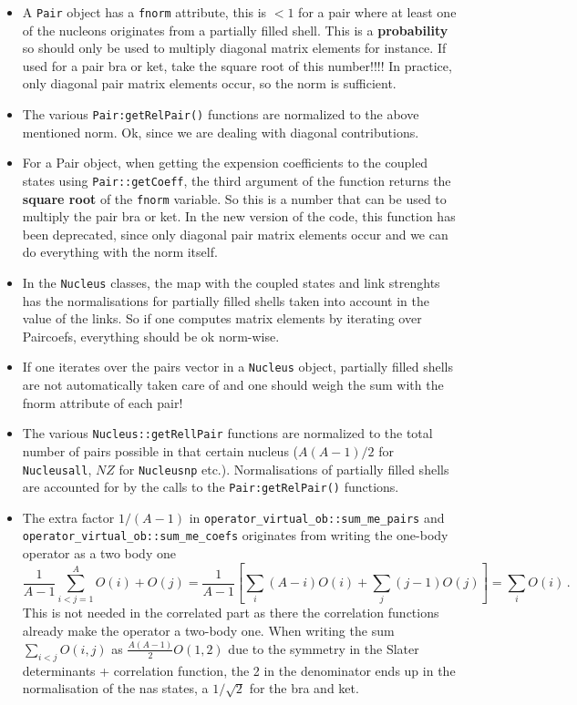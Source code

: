 \documentclass[10pt]{article}
\begin{document}
\begin{itemize}
 \item A \texttt{Pair} object has a \texttt{fnorm} attribute, this is $<1$ 
for a pair where at least one of the nucleons originates from a partially 
filled shell.  This is a \textbf{probability} so should only be used to 
multiply diagonal matrix elements for instance.  If used for a pair bra or ket, 
take the square root of this number!!!!  In practice, only diagonal pair matrix 
elements occur, so the norm is sufficient.

\item The various \texttt{Pair:getRelPair()} functions are normalized to the 
above mentioned norm.  Ok, since we are dealing with diagonal contributions.

\item For a Pair object, when getting the expension coefficients to the coupled 
states using \texttt{Pair::getCoeff}, the third argument of the function 
returns the \textbf{square root} of the \texttt{fnorm} variable.  So this is a 
number that can be used to multiply the pair bra or ket.
In the new version of the code, this function has been deprecated, since only 
diagonal pair matrix elements occur and we can do everything with the 
norm itself.

\item In the \texttt{Nucleus} classes, the map with the coupled states and link 
strenghts has the normalisations for partially filled shells taken into account 
in the value of the links.  So if one computes matrix elements by iterating 
over Paircoefs, everything should be ok norm-wise.

\item If one iterates over the pairs vector in a \texttt{Nucleus} object, 
partially filled shells are not automatically taken care of and one should 
weigh the sum with the fnorm attribute of each pair!

\item The various \texttt{Nucleus::getRellPair} functions are normalized to the 
total number of pairs possible in that certain nucleus ($A(A-1)/2$ for 
\texttt{Nucleusall}, $NZ$ for \texttt{Nucleusnp} etc.).  Normalisations of 
partially filled shells are accounted for by the calls to the 
\texttt{Pair:getRelPair()} functions.

\item The extra factor $1/(A-1)$ in 
\texttt{operator\_virtual\_ob::sum\_me\_pairs} 
and \texttt{operator\_virtual\_ob::sum\_me\_coefs} originates from writing the 
one-body operator as a two body one
\begin{equation}
 \frac{1}{A-1}\sum_{i<j=1}^A O(i)+O(j) = \frac{1}{A-1} [\sum_{i} (A-i) 
O(i)+\sum_j (j-1)O(j)] = \sum_i O(i)\,.
\end{equation}
This is not needed in the correlated part as there the correlation functions 
already make the operator a two-body one.
When writing the sum $\sum_{i<j}O(i,j)$ as $\frac{A(A-1)}{2} O(1,2)$ due to the 
symmetry in the Slater determinants + correlation function, the 2 in the 
denominator ends up in the normalisation of the nas states, a $1/\sqrt{2}$ for 
the bra and ket.


\end{itemize}
\end{document}
